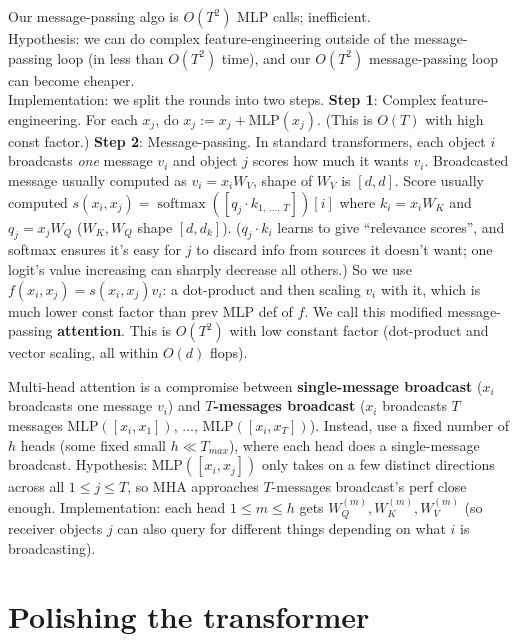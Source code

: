 \documentclass[12pt]{article}
\begin{document}
\begin{outline}
Our message-passing algo is $O(T^2)$ MLP calls; inefficient. \\

Hypothesis: we can do complex feature-engineering outside of the message-passing loop (in less than $O(T^2)$ time), and our $O(T^2)$ message-passing loop can become cheaper. \\

Implementation: we split the rounds into two steps.
\1 \textbf{Step 1}: Complex feature-engineering. For each $x_j$, do $x_j := x_j + \text{MLP}(x_j)$. (This is $O(T)$ with high const factor.)
\1 \textbf{Step 2}: Message-passing.
\2 In standard transformers, each object $i$ broadcasts \textit{one} message $v_i$ and object $j$ scores how much it wants $v_i$.
\3 Broadcasted message usually computed as $v_i = x_i W_V$, shape of $W_V$ is $[d,d]$.
\3 Score usually computed $s(x_i,x_j) = \operatorname{softmax}([q_j \cdot k_{1,\,...,\,T}])[i]$ where $k_i = x_i W_K$ and $q_j = x_j W_Q$ ($W_K,W_Q$ shape $[d,d_k]$). ($q_j \cdot k_i$ learns to give ``relevance scores'', and softmax ensures it's easy for $j$ to discard info from sources it doesn't want; one logit's value increasing can sharply decrease all others.)
\2 So we use $f(x_i,x_j) = s(x_i,x_j) v_i$: a dot-product and then scaling $v_i$ with it, which is much lower const factor than prev MLP def of $f$.
\2 We call this modified message-passing \textbf{attention}. This is $O(T^2)$ with low constant factor (dot-product and vector scaling, all within $O(d)$ flops).
\\\0

Multi-head attention is a compromise between \textbf{single-message broadcast} ($x_i$ broadcasts one message $v_i$) and \textbf{$T$-messages broadcast} ($x_i$ broadcasts $T$ messages $\text{MLP}([x_i,x_1])$, ..., $\text{MLP}([x_i,x_T])$). Instead, use a fixed number of $h$ heads (some fixed small $h \ll T_{max}$), where each head does a single-message broadcast.
\1 Hypothesis: $\text{MLP}([x_i,x_j])$ only takes on a few distinct directions across all $1 \le j \le T$, so MHA approaches $T$-messages broadcast's perf close enough.
\1 Implementation: each head $1 \le m \le h$ gets $W^{(m)}_Q,W^{(m)}_K,W^{(m)}_V$ (so receiver objects $j$ can also query for different things depending on what $i$ is broadcasting).
\0

\section{Polishing the transformer}


\end{outline}
\end{document}
